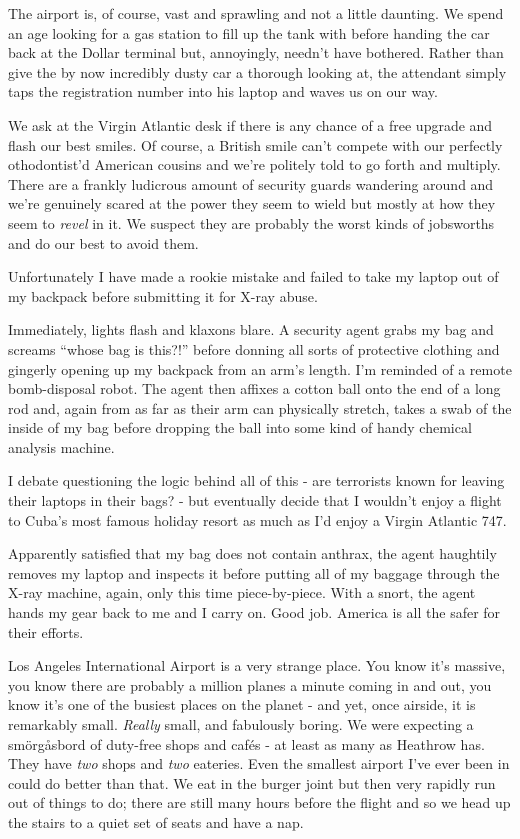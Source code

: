 \documentclass[a5paper,titlepage,11pt]{book}
\begin{document}
The airport is, of course, vast and sprawling and not a little daunting.  We spend an age looking for a gas station to fill up the tank with before handing the car back at the Dollar terminal but, annoyingly, needn't have bothered.  Rather than give the by now incredibly dusty car a thorough looking at, the attendant simply taps the registration number into his laptop and waves us on our way.

We ask at the Virgin Atlantic desk if there is any chance of a free upgrade and flash our best smiles.  Of course, a British smile can't compete with our perfectly othodontist'd American cousins and we're politely told to go forth and multiply.  There are a frankly ludicrous amount of security guards wandering around and we're genuinely scared at the power they seem to wield but mostly at how they seem to \emph{revel} in it.  We suspect they are probably the worst kinds of jobsworths and do our best to avoid them.

Unfortunately I have made a rookie mistake and failed to take my laptop out of my backpack before submitting it for X-ray abuse.

Immediately, lights flash and klaxons blare.  A security agent grabs my bag and screams ``whose bag is this?!'' before donning all sorts of protective clothing and gingerly opening up my backpack from an arm's length.  I'm reminded of a remote bomb-disposal robot.  The agent then affixes a cotton ball onto the end of a long rod and, again from as far as their arm can physically stretch, takes a swab of the inside of my bag before dropping the ball into some kind of handy chemical analysis machine.

I debate questioning the logic behind all of this - are terrorists known for leaving their laptops in their bags? - but eventually decide that I wouldn't enjoy a flight to Cuba's most famous holiday resort as much as I'd enjoy a Virgin Atlantic 747.

Apparently satisfied that my bag does not contain anthrax, the agent haughtily removes my laptop and inspects it before putting all of my baggage through the X-ray machine, again, only this time piece-by-piece.  With a snort, the agent hands my gear back to me and I carry on.  Good job.  America is all the safer for their efforts.

Los Angeles International Airport is a very strange place.  You know it's massive, you know there are probably a million planes a minute coming in and out, you know it's one of the busiest places on the planet - and yet, once airside, it is remarkably small.  \emph{Really} small, and fabulously boring.  We were expecting a sm\"{o}rg\r{a}sbord of duty-free shops and caf\'{e}s - at least as many as Heathrow has.  They have \emph{two} shops and \emph{two} eateries.  Even the smallest airport I've ever been in could do better than that.  We eat in the burger joint but then very rapidly run out of things to do; there are still many hours before the flight and so we head up the stairs to a quiet set of seats and have a nap.
\end{document}
